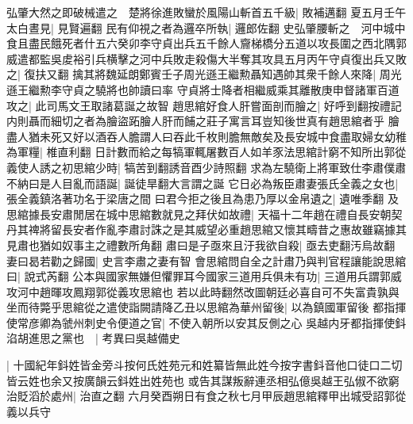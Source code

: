 弘肇大然之即破械遣之　楚將徐進敗蠻於風陽山斬首五千級|{
	敗補邁翻}
夏五月壬午太白晝見|{
	見賢遍翻}
民有仰視之者為邏卒所執|{
	邏郎佐翻}
史弘肇腰斬之　河中城中食且盡民餓死者什五六癸卯李守貞出兵五千餘人齎梯橋分五道以攻長圍之西北隅郭威遣都監吳䖍裕引兵横擊之河中兵敗走殺傷大半奪其攻具五月丙午守貞復出兵又敗之|{
	復扶又翻}
擒其將魏延朗鄭賓壬子周光遜王繼勲聶知遇帥其衆千餘人來降|{
	周光遜王繼勲李守貞之驍將也帥讀曰率}
守貞將士降者相繼威乘其離散庚申督諸軍百道攻之|{
	此司馬文王取諸葛誕之故智}
趙思綰好食人肝嘗面剖而膾之|{
	好呼到翻按禮記内則聶而細切之者為膾盜跖膾人肝而餔之莊子寓言耳豈知後世真有趙思綰者乎}
膾盡人猶未死又好以酒吞人膽謂人曰吞此千枚則膽無敵矣及長安城中食盡取婦女幼稚為軍糧|{
	椎直利翻}
日計數而給之每犒軍輒屠數百人如羊豕法思綰計窮不知所出郭從義使人誘之初思綰少時|{
	犒苦到翻誘音酉少詩照翻}
求為左驍衛上將軍致仕李肅僕肅不納曰是人目亂而語誕|{
	誕徒旱翻大言謂之誕}
它日必為叛臣肅妻張氏全義之女也|{
	張全義鎮洛著功名于梁唐之間}
曰君今拒之後且為患乃厚以金帛遺之|{
	遺唯季翻}
及思綰據長安肅閒居在城中思綰數就見之拜伏如故禮|{
	天福十二年趙在禮自長安朝契丹其禆將留長安者作亂李肅討誅之是其威望必重趙思綰又懷其疇昔之惠故雖竊據其見肅也猶如奴事主之禮數所角翻}
肅曰是子亟來且汙我欲自殺|{
	亟去吏翻汚烏故翻}
妻曰曷若勸之歸國|{
	史言李肅之妻有智}
會思綰問自全之計肅乃與判官程讓能說思綰曰|{
	說式芮翻}
公本與國家無嫌但懼罪耳今國家三道用兵俱未有功|{
	三道用兵謂郭威攻河中趙暉攻鳳翔郭從義攻思綰也}
若以此時翻然改圖朝廷必喜自可不失富貴孰與坐而待斃乎思綰從之遣使詣闕請降乙丑以思綰為華州留後|{
	以為鎮國軍留後}
都指揮使常彦卿為虢州刺史令便道之官|{
	不使入朝所以安其反側之心}
吳越内牙都指揮使鈄淊胡進思之黨也　|{
	考異曰吳越備史}


|{
	十國紀年鈄姓皆金旁斗按何氏姓苑元和姓纂皆無此姓今按字書鈄音他口徒口二切皆云姓也余又按廣韻云鈄姓出姓苑也}
或告其謀叛辭連丞相弘億吳越王弘俶不欲窮治貶滔於處州|{
	治直之翻}
六月癸酉朔日有食之秋七月甲辰趙思綰釋甲出城受詔郭從義以兵守

